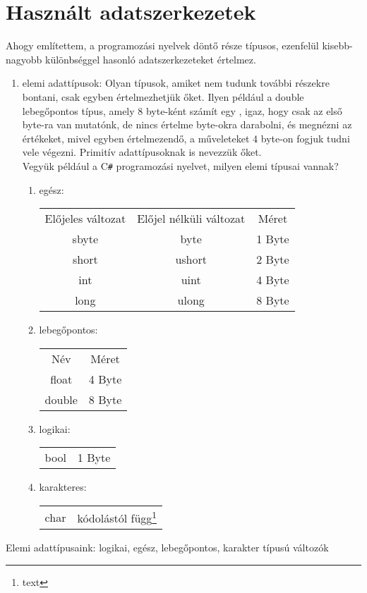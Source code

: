 \documentclass[tocnopagenum]{thesis-ekf}
\theoremstyle{definition}
\theoremstyle{remark}
\begin{document}
	\section{Használt adatszerkezetek}
	Ahogy említettem, a programozási nyelvek döntő része típusos, ezenfelül kisebb-nagyobb különbséggel hasonló adatszerkezeteket értelmez.
	\begin{enumerate}[label=\alph*)]
		\item elemi adattípusok: Olyan típusok, amiket nem tudunk további részekre bontani, csak egyben értelmezhetjük őket. Ilyen például a double lebegőpontos típus, amely 8 byte-ként számít egy , igaz, hogy csak az első byte-ra van mutatónk, de nincs értelme byte-okra darabolni, és megnézni az értékeket, mivel egyben értelmezendő, a műveleteket 4 byte-on fogjuk tudni vele végezni. Primitív adattípusoknak is nevezzük őket.\\
		Vegyük például a C\verb*|#| programozási nyelvet, milyen elemi típusai vannak?
			\begin{enumerate}
				\item egész:
				\begin{tabular}{ccc}
					Előjeles változat & Előjel nélküli változat & Méret \\
					sbyte & byte & 1 Byte \\
					short & ushort & 2 Byte \\
					int & uint & 4 Byte \\
					long & ulong & 8 Byte \\
				\end{tabular}
				\item lebegőpontos:
				\begin{tabular}{cc}
					Név & Méret \\
					float & 4 Byte \\
					double & 8 Byte
				\end{tabular}
				\item logikai: 
				\begin{tabular}{cc}
					bool & 1 Byte
				\end{tabular}
				\item karakteres: 
				\begin{tabular}{cc}
					char & kódolástól függ\footnote{text}
				\end{tabular}
			\end{enumerate}
	\end{enumerate}
	Elemi adattípusaink: logikai, egész, lebegőpontos, karakter típusú változók
	
\end{document}

